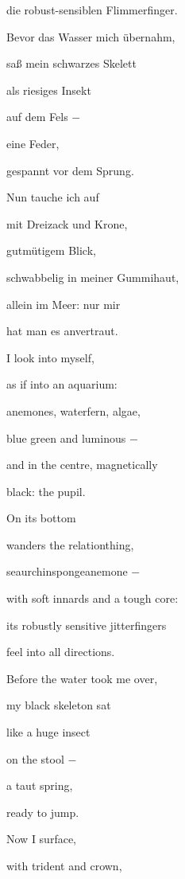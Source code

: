 die robust-sensiblen Flimmerfinger.


\bigskip

Bevor das Wasser mich übernahm,

saß mein schwarzes Skelett

als riesiges Insekt

auf dem Fels $-$ 

eine Feder,

gespannt vor dem Sprung.


\bigskip

Nun tauche ich auf

mit Dreizack und Krone,

gutmütigem Blick,

schwabbelig in meiner Gummihaut,

allein im Meer: nur mir

hat man es anvertraut.


\bigskip


\bigskip



\bigskip

I look into myself,

as if into an aquarium:

anemones, waterfern, algae,

blue green and luminous $-$

and in the centre, magnetically

black: the pupil.


\bigskip

On its bottom 

wanders the relationthing,

seaurchinspongeanemone $-$

with soft innards and a tough core:

its robustly sensitive jitterfingers

feel into all directions.


\bigskip

Before the water took me over,

my black skeleton sat

like a huge insect

on the stool $-$

a taut spring,

ready to jump.


\bigskip

Now I surface,

with trident and crown,

